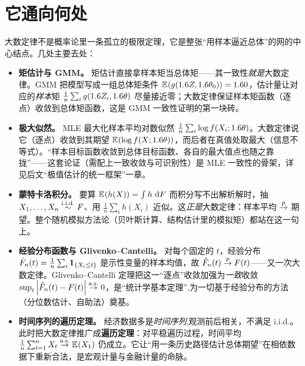 
\section{它通向何处}
\label{sec:lln-applications}

大数定律不是概率论里一条孤立的极限定理，它是整张``用样本逼近总体''的网的中心结点。几处主要去处：

\begin{itemize}
    \item \textbf{矩估计与 GMM。} 矩估计直接拿样本矩当总体矩——其一致性\emph{就是}大数定律。GMM 把模型写成一组总体矩条件 $\mathbb{E}_{}\!\left(g(1.6 Z,1.6\theta_0)\right)=1.6 0$，估计量让对应的\emph{样本}矩 $\frac1n\sum_i g(1.6 Z_i,1.6\theta)$ 尽量接近零；大数定律保证样本矩函数（逐点）收敛到总体矩函数，这是 GMM 一致性证明的第一块砖。
    \item \textbf{极大似然。} MLE 最大化样本平均对数似然 $\frac1n\sum_i\log f(X_i;1.6\theta)$。大数定律说它（逐点）收敛到其期望 $\mathbb{E}_{}\!\left(\log f(X;1.6\theta)\right)$，而后者在真值处取最大（信息不等式）。``样本目标函数收敛到总体目标函数、各自的最大值点也随之靠拢''——这套论证（需配上一致收敛与可识别性）是 MLE 一致性的骨架，详见后文``极值估计的统一框架''一章。
    \item \textbf{蒙特卡洛积分。} 要算 $\mathbb{E}_{}\!\left(h(X)\right)=\int h\,\mathop{}\!\mathrm{d} F$ 而积分写不出解析解时，抽 $X_1,\dots,X_n\overset{\mathrm{i.i.d.}}{\sim} F$、用 $\frac1n\sum_i h(X_i)$ 近似。这\emph{正是}大数定律：样本平均 $\overset{p}{\to}$ 期望。整个随机模拟方法论（贝叶斯计算、结构估计里的模拟矩）都站在这一句上。
    \item \textbf{经验分布函数与 Glivenko--Cantelli。} 对每个固定的 $t$，经验分布 $\hat F_n(t)=\frac1n\sum_i\mathbf{1}_{\left\{X_i\le t\right\}}$ 是示性变量的样本均值，故 $\hat F_n(t)\overset{p}{\to} F(t)$——又一次大数定律。Glivenko--Cantelli 定理把这一``逐点''收敛加强为\emph{一致}收敛 $\sup_t\left|\hat F_n(t)-F(t)\right|\overset{\mathrm{a.s.}}{\to} 0$，是``统计学基本定理'',为一切基于经验分布的方法（分位数估计、自助法）奠基。
    \item \textbf{时间序列的遍历定理。} 经济数据多是\emph{时间序列},观测前后相关，不满足 i.i.d.。此时把大数定律推广成\textbf{遍历定理}：对平稳遍历过程，时间平均 $\frac1n\sum_{t=1}^n X_t\overset{\mathrm{a.s.}}{\to}\mathbb{E}_{}\!\left(X_1\right)$ 仍成立。它让``用一条历史路径估计总体期望''在相依数据下重新合法，是宏观计量与金融计量的命脉。
\end{itemize}

